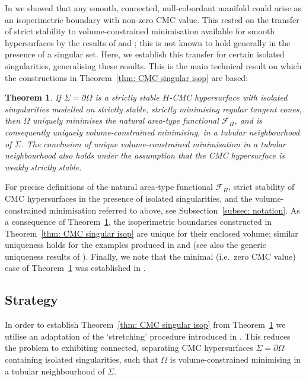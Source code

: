 \documentclass[12pt]{article}
\newtheorem{theorem}{Theorem}
\begin{document}
\bigskip

In \cite[Corollary 2 \& Remark 4]{MN26} we showed that any smooth, connected, null-cobordant manifold could arise as an isoperimetric boundary with non-zero CMC value. This rested on the transfer of strict stability to volume-constrained minimisation available for smooth hypersurfaces by the results of \cite{W94} and \cite{G96}; this is not known to hold generally in the presence of a singular set. Here, we establish this transfer for certain isolated singularities, generalising these results. This is the main technical result on which the constructions in Theorem~\ref{thm: CMC singular isop} are based:

\begin{theorem}\label{thm: strict stability to VCM}
    If $\Sigma = \partial \Omega$ is a strictly stable $H$-CMC hypersurface with isolated singularities modelled on strictly stable, strictly minimising regular tangent cones, then $\Omega$ uniquely minimises the natural area-type functional $\mathcal{F}_H$, and is consequently uniquely volume-constrained minimising, in a tubular neighbourhood of $\Sigma$. The conclusion of unique volume-constrained minimisation in a tubular neighbourhood also holds under the assumption that the CMC hypersurface is weakly strictly stable. 
\end{theorem}

For precise definitions of the natural area-type functional $\mathcal{F}_H$, strict stability of CMC hypersurfaces in the presence of isolated singularities, and the volume-constrained minimisation referred to above, see Subsection~\ref{subsec: notation}. As a consequence of Theorem~\ref{thm: strict stability to VCM}, the isoperimetric boundaries constructed in Theorem~\ref{thm: CMC singular isop} are unique for their enclosed volume; similar uniqueness holds for the examples produced in \cite{MN26} and \cite{N24} (see also the generic uniqueness results of \cite{N26}). Finally, we note that the minimal (i.e.~zero CMC value) case of Theorem~\ref{thm: strict stability to VCM} was established in \cite{S99}.

\subsection{Strategy}

In order to establish Theorem~\ref{thm: CMC singular isop} from Theorem~\ref{thm: strict stability to VCM} we utilise an adaptation of the `stretching' procedure introduced in \cite[Theorem 1]{MN26}. This reduces the problem to exhibiting connected, separating CMC hypersurfaces $\Sigma = \partial \Omega$ containing isolated singularities, such that $\Omega$ is volume-constrained minimising in a tubular neighbourhood of $\Sigma$.
\end{document}
